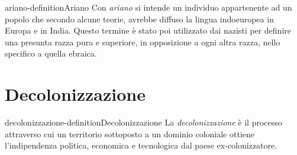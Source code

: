 \documentclass[preview]{standalone}
\begin{document}
\begin{snippetdefinition}{ariano-definition}{Ariano}
    Con \textit{ariano} si intende un individuo appartenente ad un popolo
    che secondo alcune teorie, avrebbe diffuso la lingua indoeuropea in Europa
    e in India. Questo termine è stato poi utilizzato dai nazisti per definire
    una presunta razza pura e superiore, in opposizione a ogni altra razza,
    nello specifico a quella ebraica.
\end{snippetdefinition}

\section{Decolonizzazione}

\begin{snippetdefinition}{decolonizzazione-definition}{Decolonizzazione}
    La \textit{decolonizzazione} è il processo attraverso cui
    un territorio sottoposto a un dominio coloniale ottiene l'indipendenza
    politica, economica e tecnologica dal paese ex-colonizzatore.
\end{snippetdefinition}
\end{document}
